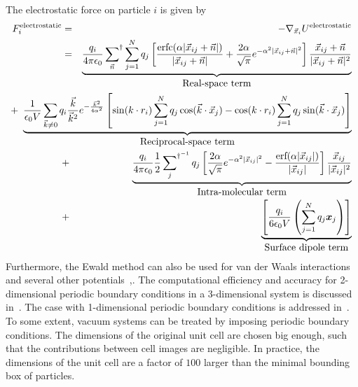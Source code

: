 \documentclass[11pt]{article}
\newcommand{\erf}{\mbox{erf}}
\newcommand{\erfc}{\mbox{erfc}}
\providecommand{\bm}[1]{\mbox{\boldmath${#1}$}}
\providecommand{\textinmath}[1]{\mbox{#1}}
\providecommand{\textinmathss}[1]{\mbox{\scriptsize #1}}
\begin{document}
The electrostatic force on particle $i$ is given by
%
\begin{eqnarray}
\label{eq:ewald-force}
F^{\textinmathss{electrostatic}}_i &=& - \nabla_{\vec{x}_i} U^{\textinmathss{electrostatic}} \nonumber\\
& = & \underbrace{\frac{q_i}{4 \pi \epsilon_0} \sideset{}{^\dag}\sum_{\vec{n}}
\sum_{j=1}^{N} q_j \left [ \frac{\erfc( \alpha |
\vec{x}_{ij} + \vec{n} |)}{|\vec{x}_{ij} +\vec{n} | } + \frac{2
\alpha}{\sqrt{\pi}}e^{- \alpha^2 | \vec{x}_{ij} + \vec{n} |^2} \right ]
\frac{\vec{x}_{ij} + \vec{n}}{| \vec{x}_{ij} + \vec{n}
|^2}}_{\textinmath{Real-space term}} \nonumber \\
& &\hspace{-3cm}+~  \underbrace{\frac{1}{\epsilon_0 V} \sum_{\vec{k} \neq 0} q_i
\frac{\vec{k}}{\vec{k}^2} e^{-\frac{\vec{k}^2}{4 \alpha^2}} \left [  \sin(k
\cdot r_i) \sum_{j=1}^{N} q_j \cos(\vec{k} \cdot \vec{x}_j) - \cos(k
\cdot r_i) \sum_{j=1}^{N} q_j \sin(\vec{k} \cdot \vec{x}_j) \right
]}_{\textinmath{Reciprocal-space term}}\nonumber\\
& + & \underbrace{\frac{q_i}{4 \pi \epsilon_0} \frac{1}{2} \sideset{}{^{\dag ^{-1}}}\sum_{j}
    q_j \left [ \frac{2 \alpha}{\sqrt{\pi}}e^{-
\alpha^2 | \vec{x}_{ij}  |^2} -\frac{  \erf( \alpha | \vec{x}_{ij}
|)}{|\vec{x}_{ij}|} \right ] \frac{\vec{x}_{ij}}{| \vec{x}_{ij}
|^2}}_{\textinmath{Intra-molecular term}}\\
  & + & \underbrace{\left [ \frac{q_i}{6 \epsilon_0 V} \left (
        \sum_{j=1}^N q_j \bm{x}_j \right ) \right
    ]}_{\textinmath{Surface dipole term}} 
\end{eqnarray}
%
Furthermore, the Ewald method can also be used for van der Waals
interactions~\cite{ChCG97,KaGo89} and several other
potentials~\cite[pp.~237-256]{Gao98},\cite{LPSm80}.
The computational efficiency and
accuracy for 2-dimensional periodic boundary conditions in a
3-dimensional system is discussed in~\cite{KaMi01}. The case with 1-dimensional periodic
boundary conditions is addressed in~\cite{LaHC01}.
To some extent, vacuum systems can be treated by imposing periodic
boundary conditions. The dimensions
of the original unit cell are chosen big enough, such that the
contributions between cell images are negligible. In practice, the
dimensions of the unit cell are a factor of $100$ larger than the minimal
bounding box of particles.\\
\end{document}
